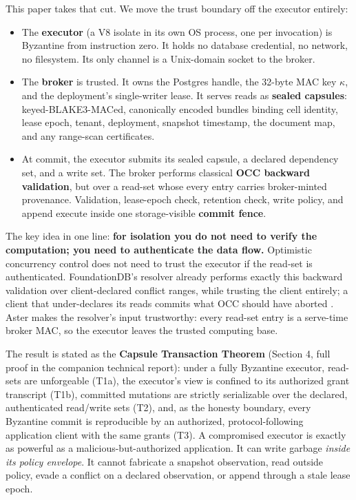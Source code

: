 \documentclass[
  11pt,
]{article}
\providecommand{\tightlist}{%
  \setlength{\itemsep}{0pt}\setlength{\parskip}{0pt}}
\begin{document}
This paper takes that cut. We move the trust boundary off the executor entirely:

\begin{itemize}
\tightlist
\item
  The \textbf{executor} (a V8 isolate in its own OS process, one per invocation) is Byzantine from instruction zero. It holds no database credential, no network, no filesystem. Its only channel is a Unix-domain socket to the broker.
\item
  The \textbf{broker} is trusted. It owns the Postgres handle, the 32-byte MAC key $\kappa$, and the deployment's single-writer lease. It serves reads as \textbf{sealed capsules}: keyed-BLAKE3-MACed, canonically encoded bundles binding cell identity, lease epoch, tenant, deployment, snapshot timestamp, the document map, and any range-scan certificates.
\item
  At commit, the executor submits its sealed capsule, a declared dependency set, and a write set. The broker performs classical \textbf{OCC backward validation}, but over a read-set whose every entry carries broker-minted provenance. Validation, lease-epoch check, retention check, write policy, and append execute inside one storage-visible \textbf{commit fence}.
\end{itemize}

The key idea in one line: \textbf{for isolation you do not need to verify the computation; you need to authenticate the data flow.} Optimistic concurrency control does not need to trust the executor if the read-set is authenticated. FoundationDB's resolver already performs exactly this backward validation over client-declared conflict ranges, while trusting the client entirely; a client that under-declares its reads commits what OCC should have aborted \cite{fdb2021}. Aster makes the resolver's input trustworthy: every read-set entry is a serve-time broker MAC, so the executor leaves the trusted computing base.

The result is stated as the \textbf{Capsule Transaction Theorem} (Section 4, full proof in the companion technical report): under a fully Byzantine executor, read-sets are unforgeable (T1a), the executor's view is confined to its authorized grant transcript (T1b), committed mutations are strictly serializable over the declared, authenticated read/write sets (T2), and, as the honesty boundary, every Byzantine commit is reproducible by an authorized, protocol-following application client with the same grants (T3). A compromised executor is exactly as powerful as a malicious-but-authorized application. It can write garbage \emph{inside its policy envelope}. It cannot fabricate a snapshot observation, read outside policy, evade a conflict on a declared observation, or append through a stale lease epoch.
\end{document}

